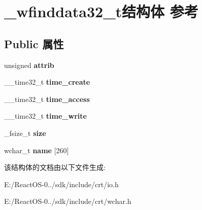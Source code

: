 \hypertarget{struct__wfinddata32__t}{}\section{\+\_\+wfinddata32\+\_\+t结构体 参考}
\label{struct__wfinddata32__t}
\subsection*{Public 属性}
\begin{DoxyCompactItemize}
\item 
\mbox{\label{struct__wfinddata32__t_abc7a6355fdc4ee526abfa3506576bc9a}} 
unsigned {\bfseries attrib}
\item 
\mbox{\label{struct__wfinddata32__t_ac01fca0a629c64b8cf30c8acfe014a46}} 
\+\_\+\+\_\+time32\+\_\+t {\bfseries time\+\_\+create}
\item 
\mbox{\label{struct__wfinddata32__t_a8a4ed4af9a85048a5d2f1ba90722f425}} 
\+\_\+\+\_\+time32\+\_\+t {\bfseries time\+\_\+access}
\item 
\mbox{\label{struct__wfinddata32__t_aad0cdfc390576295df1b8974466109f0}} 
\+\_\+\+\_\+time32\+\_\+t {\bfseries time\+\_\+write}
\item 
\mbox{\label{struct__wfinddata32__t_af3086449396c5813bff2e608c49cf3a3}} 
\+\_\+fsize\+\_\+t {\bfseries size}
\item 
\mbox{\label{struct__wfinddata32__t_aeae615849d6b44f55aea83bec1a4af1c}} 
wchar\+\_\+t {\bfseries name} \mbox{[}260\mbox{]}
\end{DoxyCompactItemize}


该结构体的文档由以下文件生成\+:\begin{DoxyCompactItemize}
\item 
E\+:/\+React\+O\+S-\/0../sdk/include/crt/io.\+h\item 
E\+:/\+React\+O\+S-\/0../sdk/include/crt/wchar.\+h\end{DoxyCompactItemize}
